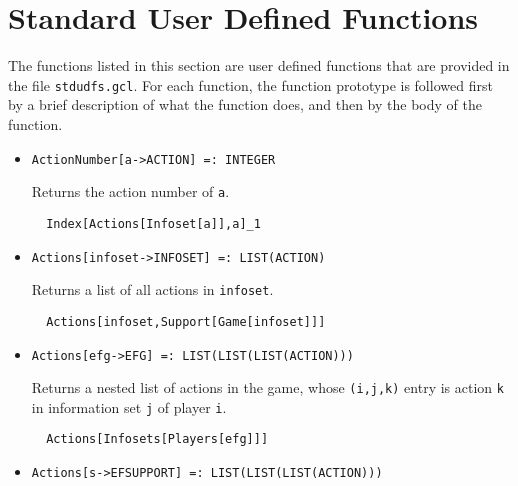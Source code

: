 \section{Standard User Defined Functions}
\renewcommand{\mysectionname}{\thesection\,\, USER DEFINED FUNCTIONS}

The functions listed in this section are user defined functions that
are provided in the file \verb+stdudfs.gcl+.  For each function, the
function prototype is followed first by a brief description of what
the function does, and then by the body of the function.  

\begin{itemize}


\item{}
\protect \large \begin{verbatim}
ActionNumber[a->ACTION] =: INTEGER 
\end{verbatim}\normalsize

\bd 
Returns the action number of \verb+a+.
\begin{verbatim}
  Index[Actions[Infoset[a]],a]_1
\end{verbatim} 
\ed

\item{}
\protect \large \begin{verbatim}
Actions[infoset->INFOSET] =: LIST(ACTION) 
\end{verbatim}\normalsize

\bd 
Returns a list of all actions in \verb+infoset+.

\begin{verbatim}
  Actions[infoset,Support[Game[infoset]]]
\end{verbatim} 
\ed

\item{}
\protect \large \begin{verbatim}
Actions[efg->EFG] =: LIST(LIST(LIST(ACTION))) 
\end{verbatim}\normalsize

\bd 
Returns a nested list of actions in the game, whose  \verb+(i,j,k)+
entry is action \verb+k+ in information set \verb+j+ of player \verb+i+.

\begin{verbatim}
  Actions[Infosets[Players[efg]]]
\end{verbatim} 
\ed

\item{}
\protect \large \begin{verbatim}
Actions[s->EFSUPPORT] =: LIST(LIST(LIST(ACTION))) 
\end{verbatim}\normalsize


\end{itemize}
